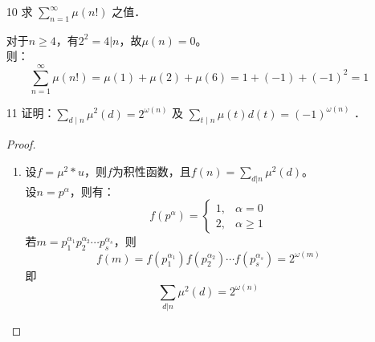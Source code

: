 \begin{enumerate}
\begin{proof}
\begin{enumerate}
            交换求和次序，有：
            \[\sum\limits_{d|n}\mu(d)\log^m d=\sum\limits_{p_1|n}\cdots\sum\limits_{p_m|n}\log p_1\cdots\log p_m\sum\limits_{\substack{d \mid n\\ p_1|d,\cdots,p_m|d} }\mu(d)\]
            固定$p_1,p_2,\cdots,p_m$，令$S=\{s:s=p_i,i=1,2,\cdots,m\}$为其中不同素因子的集合；设$r=|S|$，则$r\leq m<k.$\\
            则：
            \begin{align*}
                &\sum\limits_{\substack{d \mid n \\p_1|d,\cdots,p_m|d}}\mu(d)\\
                &=(-1)^r\left[(-1)^0\binom{k-r}{0}+(-1)^1\binom{k-r}{1}+\cdots+(-1)^{k-r}\binom{k-r}{k-r}\right]\\
                &=(-1)^r(-1+1)^{k-r}\\
                &=0
            \end{align*}
            因此，
            \[\sum\limits_{d|n}\mu(d)\log^m d=0\]
        \end{enumerate}
    \end{proof} 
    \item[10] 求 $\sum_{n=1}^{\infty} \mu(n!)$ 之值．
    \begin{solution}
      对于$n\geq 4$，有$2^2=4|n$，故$\mu(n)=0$。\\
则：
\begin{equation*}
    \sum\limits_{n=1}^\infty\mu(n!)=\mu(1)+\mu(2)+\mu(6)=1+(-1)+(-1)^2=1
\end{equation*}
    \end{solution}
    \item[11] 证明：$\sum_{d \mid n} \mu^2(d)=2^{\omega(n)}$ 及 $\sum_{t \mid n} \mu(t) d(t)=(-1)^{\omega(n)}$ ．
    \begin{proof}
        \begin{enumerate}
            \item 设$f=\mu^2 * u$，则$f$为积性函数，且$f(n)=\sum\limits_{d|n}\mu^2(d)$。\\
            设$n=p^\alpha$，则有：
            \[f(p^\alpha)=\begin{cases}
                1, & \alpha=0\\
                2, & \alpha\geq 1
            \end{cases}\]
            若$m=p_1^{\alpha_1}p_2^{\alpha_2}\cdots p_s^{\alpha_s}$，则
            \[f(m)=f(p_1^{\alpha_1})f(p_2^{\alpha_2})\cdots f(p_s^{\alpha_s})=2^{\omega(m)}\]
            即
            \[\sum\limits_{d|n}\mu^2(d)=2^{\omega(n)}\]
            

\end{enumerate}
\end{proof}
\end{enumerate}
